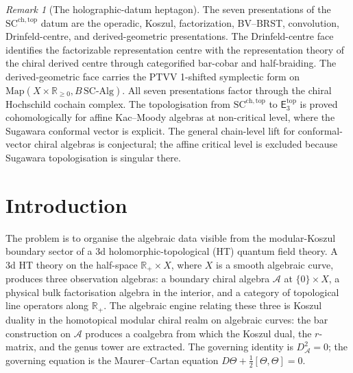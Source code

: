 \documentclass[11pt,reqno]{amsart}
\theoremstyle{definition}
\theoremstyle{remark}
\newtheorem{remark}[theorem]{Remark}
\newcommand{\cA}{\mathcal{A}}
\newcommand{\Ethree}{\mathsf{E}_{3}}
\newcommand{\SCchtop}{\mathrm{SC}^{\mathrm{ch,top}}}
\newcommand{\bR}{\mathbb{R}}
\numberwithin{equation}{section}
\begin{document}
\begin{remark}[The holographic-datum heptagon]\label{rem:holographic-heptagon}
The seven presentations of the $\SCchtop$ datum are the operadic,
Koszul, factorization, BV--BRST, convolution, Drinfeld-centre, and
derived-geometric presentations. The Drinfeld-centre face identifies
the factorizable representation centre with the representation theory
of the chiral derived centre through categorified bar-cobar and
half-braiding. The derived-geometric face carries the PTVV
1-shifted symplectic form on
\(\mathrm{Map}(X \times \bR_{\geq 0},B\,\mathrm{SC\text{-}Alg})\).
All seven presentations factor through the chiral Hochschild cochain
complex. The topologisation from $\SCchtop$ to
\(\Ethree^{\mathrm{top}}\) is proved cohomologically for affine
Kac--Moody algebras at non-critical level, where the Sugawara
conformal vector is explicit. The general chain-level lift for
conformal-vector chiral algebras is conjectural; the affine critical
level is excluded because Sugawara topologisation is singular there.
\end{remark}

\maketitle

\tableofcontents


\section{Introduction}\label{sec:intro}

The problem is to organise the algebraic data visible from the
modular-Koszul boundary sector of a 3d holomorphic-topological (HT)
quantum field theory. A 3d HT
theory on the half-space $\bR_+ \times X$, where $X$ is a smooth
algebraic curve, produces three observation algebras: a boundary
chiral algebra $\cA$ at $\{0\} \times X$, a physical bulk
factorisation algebra in the interior, and a category of topological
line operators along $\bR_+$.
The algebraic engine relating these three is Koszul duality in the
homotopical modular chiral realm on algebraic curves: the bar
construction on $\cA$ produces a coalgebra from which the Koszul dual,
the $r$-matrix, and the genus tower are extracted. The governing
identity is $D_{\cA}^2 = 0$; the governing equation is the
Maurer--Cartan equation $D\Theta + \frac{1}{2}[\Theta,\Theta] = 0$.
\end{document}
